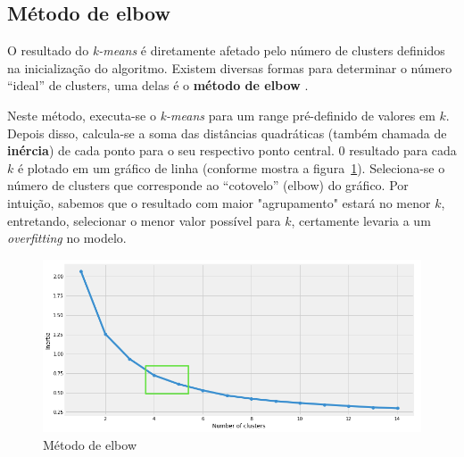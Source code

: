  
 \subsection{Método de elbow}\label{ssec:elbow}
 O resultado do \emph{k-means} é diretamente afetado pelo número de clusters definidos na inicialização do algoritmo.
 Existem diversas formas para determinar o número ``ideal'' de clusters, uma delas é o \textbf{método de elbow} \cite{Humaira}.
 
 Neste método, executa-se o \emph{k-means} para um range pré-definido de valores em $k$. 
 Depois disso, calcula-se a soma das distâncias quadráticas (também chamada de \textbf{inércia}) de cada ponto para o seu respectivo ponto central.
 0 resultado para cada $k$ é plotado em um gráfico de linha (conforme mostra a figura~\ref{fig:elbow}).
 Seleciona-se o número de clusters que corresponde ao ``cotovelo'' (elbow) do gráfico.
 Por intuição, sabemos que o resultado com maior "agrupamento" estará no menor $k$, entretando, 
 selecionar o menor valor possível para $k$, certamente levaria a um \emph{overfitting} no modelo.
 
\begin{figure}[H]
   \centering
   \includegraphics[scale=0.40]{figs/elbowex.png}
    \caption{Método de elbow}
    \label{fig:elbow}
\end{figure}

 
 



